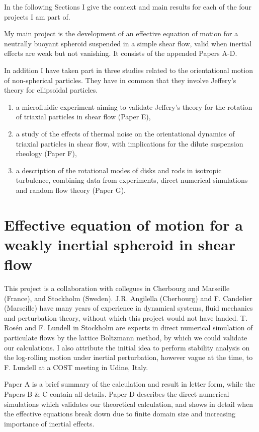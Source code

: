 \documentclass[thesis.tex]{subfiles}
\begin{document}
In the following Sections I give the context and main results for each of the four projects I am part of.

My main project is the development of an effective equation of motion for a neutrally buoyant spheroid suspended in a simple shear flow, valid when inertial effects are weak but not vanishing. It consists of the appended Papers A-D.

In addition I have taken part in three studies related to the orientational motion of non-spherical particles. They have in common that they involve Jeffery's theory for ellipsoidal particles.
\begin{enumerate}
    \item a microfluidic experiment aiming to validate Jeffery's theory for the rotation of triaxial particles in shear flow (Paper E),
    \item a study of the effects of thermal noise on the orientational dynamics of triaxial particles in shear flow, with implications for the dilute suspension rheology (Paper F),
    \item a description of the rotational modes of disks and rods in isotropic turbulence, combining data from experiments, direct numerical simulations and random flow theory (Paper G).
\end{enumerate}

\chapter{Effective equation of motion for a weakly inertial spheroid in shear flow}

This project is a collaboration with collegues in Cherbourg and Marseille (France), and Stockholm (Sweden). J.R. Angilella (Cherbourg) and F. Candelier (Marseille) have many years of experience in dynamical systems, fluid mechanics and perturbation theory, without which this project would not have landed. T. Ros\'en and F. Lundell in Stockholm are experts in direct numerical simulation of particulate flows by the lattice Boltzmann method, by which we could validate our calculations. I also attribute the initial idea to perform stability analysis on the log-rolling motion under inertial perturbation, however vague at the time, to F. Lundell at a COST meeting in Udine, Italy. 

Paper A is a brief summary of the calculation and result in letter form, while the Papers B \& C contain all details. Paper D describes the direct numerical simulations which validates our theoretical calculation, and shows in detail when the effective equations break down due to finite domain size and increasing importance of inertial effects.
\end{document}
